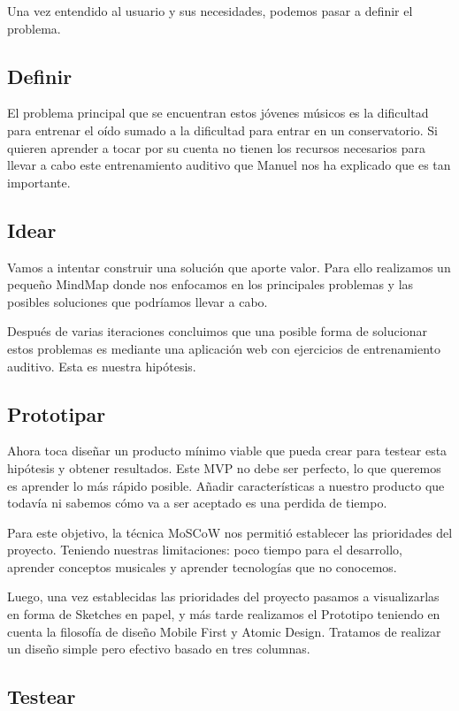 \documentclass[12pt,twoside,titlepage]{report}
\begin{document}
Una vez entendido al usuario y sus necesidades, podemos pasar a definir el problema.

\subsection{Definir}

El problema principal que se encuentran estos jóvenes músicos es la dificultad para entrenar el oído sumado a la dificultad para entrar en un conservatorio. Si quieren aprender a tocar por su cuenta no tienen los recursos necesarios para llevar a cabo este entrenamiento auditivo que Manuel nos ha explicado que es tan importante.

\subsection{Idear}

Vamos a intentar construir una solución que aporte valor. Para ello realizamos un pequeño MindMap donde nos enfocamos en los principales problemas y las posibles soluciones que podríamos llevar a cabo.

Después de varias iteraciones concluimos que una posible forma de solucionar estos problemas es mediante una aplicación web con ejercicios de entrenamiento auditivo. Esta es nuestra hipótesis.

\subsection{Prototipar}

Ahora toca diseñar un producto mínimo viable que pueda crear para testear esta hipótesis y obtener resultados. Este MVP no debe ser perfecto, lo que queremos es aprender lo más rápido posible. Añadir características a nuestro producto que todavía ni sabemos cómo va a ser aceptado es una perdida de tiempo. 

Para este objetivo, la técnica MoSCoW nos permitió establecer las prioridades del proyecto. Teniendo nuestras limitaciones: poco tiempo para el desarrollo, aprender conceptos musicales y aprender tecnologías que no conocemos.

Luego, una vez establecidas las prioridades del proyecto pasamos a visualizarlas en forma de Sketches en papel, y más tarde realizamos el Prototipo teniendo en cuenta la filosofía de diseño Mobile First y Atomic Design. Tratamos de realizar un diseño simple pero efectivo basado en tres columnas.

\subsection{Testear}
\end{document}
